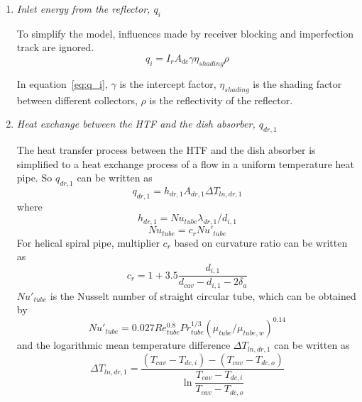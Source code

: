 \begin{enumerate}
  \item \emph{Inlet energy from the reflector, $q_i$}
  
  To simplify the model, influences made by receiver blocking and imperfection track are ignored.  
  \begin{equation}\label{eq:q_i}
      q_i = I_r A_{dc} \gamma \eta_{shading} \rho
  \end{equation}
  
  In equation~\ref{eq:q_i}, $\gamma$ is the intercept factor, $\eta_{shading}$ is the shading factor between different collectors, $\rho$ is the reflectivity of the reflector.
  \item \emph{Heat exchange between the HTF and the dish absorber, $q_{dr,1}$}
  
  The heat transfer process between the HTF and the dish absorber is simplified to a heat exchange process of a flow in a uniform temperature heat pipe. So $q_{dr,1}$ can be written as  
  \begin{equation}\label{eq:q_dr_1}
      q_{dr,1} = h_{dr,1}A_{dr,1}\Delta T_{ln,dr,1}
  \end{equation}
  where  
  \begin{equation}
      h_{dr,1} = Nu_{tube}\lambda_{dr,1} / d_{i,1}
\end{equation}
\begin{equation}
      Nu_{tube} = c_r Nu'_{tube}
\end{equation}
    For helical spiral pipe, multiplier $c_r$ based on curvature ratio can be written as~\cite{Pablo2008}
\begin{equation}
	c_{r}=1+3.5\frac{d_{i,1}}{d_{cav}-d_{i,1}-2\delta_{a}}
\end{equation}
$Nu'_{tube}$ is the Nusselt number of straight circular tube, which can be obtained by~\cite{Serth2007}
\begin{equation}
	Nu'_{tube}= 0.027Re_{tube}^{0.8}Pr_{tube}^{1/3}(\mu_{tube}/\mu_{tube,w})^{0.14}
\end{equation}
and the logarithmic mean temperature difference $\Delta{}T_{ln,dr,1}$ can be written as
\begin{equation}
	\Delta{}T_{ln,dr,1}=\frac{(T_{cav}-T_{dc,i})-(T_{cav}-T_{dc,o})}{\ln\dfrac{T_{cav}-T_{dc,i}}{T_{cav}-T_{dc,o}}}
\end{equation}


\end{enumerate}
